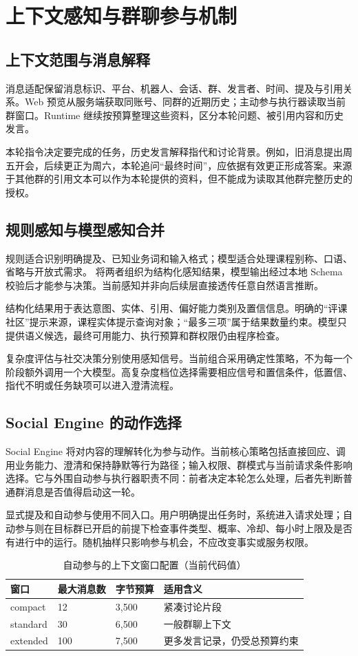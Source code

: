 \section{上下文感知与群聊参与机制}
\subsection{上下文范围与消息解释}
消息适配保留消息标识、平台、机器人、会话、群、发言者、时间、提及与引用关系。Web 预览从服务端获取同账号、同群的近期历史；主动参与执行器读取当前群窗口。Runtime 继续按预算整理这些资料，区分本轮问题、被引用内容和历史发言。

本轮指令决定要完成的任务，历史发言解释指代和讨论背景。例如，旧消息提出周五开会，后续更正为周六，本轮追问“最终时间”，应依据有效更正形成答案。来源于其他群的引用文本可以作为本轮提供的资料，但不能成为读取其他群完整历史的授权。

\subsection{规则感知与模型感知合并}
规则适合识别明确提及、已知业务词和输入格式；模型适合处理课程别称、口语、省略与开放式需求。 将两者组织为结构化感知结果，模型输出经过本地 Schema 校验后才能参与决策。当前感知并非向后续层直接透传任意自然语言推断。

结构化结果用于表达意图、实体、引用、偏好能力类别及置信信息。明确的“评课社区”提示来源，课程实体提示查询对象；“最多三项”属于结果数量约束。模型只提供语义候选，最终可用能力、执行预算和群权限仍由程序检查。

复杂度评估与社交决策分别使用感知信号。当前组合采用确定性策略，不为每一个阶段额外调用一个大模型。高复杂度档位选择需要相应信号和置信条件，低置信、指代不明或任务缺项可以进入澄清流程。

\subsection{Social Engine 的动作选择}
Social Engine 将对内容的理解转化为参与动作。当前核心策略包括直接回应、调用业务能力、澄清和保持静默等行为路径；输入权限、群模式与当前请求条件影响选择。它与外围自动参与执行器职责不同：前者决定本轮怎么处理，后者先判断普通群消息是否值得启动这一轮。

显式提及和自动参与使用不同入口。用户明确提出任务时，系统进入请求处理；自动参与则在目标群已开启的前提下检查事件类型、概率、冷却、每小时上限及是否有进行中的运行。随机抽样只影响参与机会，不应改变事实或服务权限。

\begin{table}[htbp]\centering
\caption{自动参与的上下文窗口配置（当前代码值）}
\begin{tabularx}{\textwidth}{@{}L{32mm}L{28mm}L{30mm}Y@{}}\toprule
窗口 & 最大消息数 & 字节预算 & 适用含义\\\midrule
compact & 12 & 3,500 & 紧凑讨论片段\\
standard & 30 & 6,500 & 一般群聊上下文\\
extended & 100 & 7,500 & 更多发言记录，仍受总预算约束\\\bottomrule
\end{tabularx}
\end{table}

